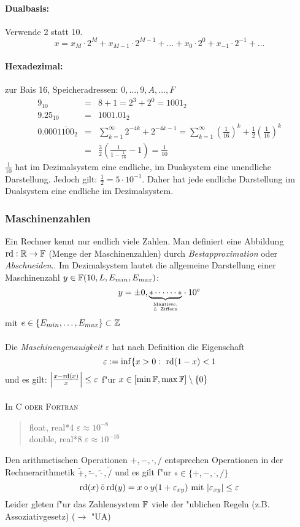 \documentclass{scrartcl}
\begin{document}
\paragraph*{Dualbasis:} Verwende 2 statt 10.
$$ x = x_M \cdot 2^M + x_{M-1}\cdot 2^{M-1} + \ldots + x_0 \cdot 2^0 + x_{-1} \cdot  2^{-1} + \ldots $$ 
\paragraph*{Hexadezimal:} zur Bais 16, Speicheradressen: $0, \ldots, 9, A, \ldots, F$
\begin{eqnarray*}
9_{10} & = & 8 + 1 = 2^3 + 2^0 = 1001_2 \\
9.25_{10} & = & 1001.01_2 \\
0.000\overline{1100}_2 & = & \sum\limits_{k=1}^{\infty} 2^{-4k} + 2^{-4k-1} = \sum\limits_{k=1}^{\infty} \left( \frac{1}{16} \right)^k + \frac{1}{2}  \left( \frac{1}{16} \right)^k \\
& = & \frac{3}{2} \left( \frac{1}{1-\frac{1}{16}} - 1 \right)= \frac{1}{10}
\end{eqnarray*} 
$\frac{1}{10}$ hat im Dezimalsystem eine endliche, im Dualsystem eine unendliche Darstellung. Jedoch gilt: $\frac{1}{2} = 5 \cdot 10^{-1}$. Daher hat jede endliche Darstellung im Dualsystem eine endliche im Dezimalsystem.

\subsubsection{Maschinenzahlen}
Ein Rechner kennt nur endlich viele Zahlen. Man definiert eine Abbildung $\mathrm{rd}: \mathbb{R} \rightarrow \mathbb{F}$ (Menge der Maschinenzahlen) durch \emph{Bestapproximation} oder \emph{Abschneiden}.. Im Dezimalsystem lautet die allgemeine Darstellung einer Maschinenzahl $y \in \mathbb{F}(10, L, E_{min}, E_{max})$:
$$ y = \pm 0, {\underbrace{* \cdots \cdots  *}_{ \genfrac{}{}{0pt}{}{\mathrm{Mantisse,}}{L  \ \mathrm{Ziffern}}   }}\cdot 10^e$$
mit $e \in \{ E_{min}, \ldots, E_{max} \} \subset \mathbb{Z}$ \\ \\
Die \emph{Maschinengenauigkeit} $\varepsilon$ hat nach Definition die Eigenschaft 
$$ \varepsilon := \inf \{ x>0: \ \mathrm{rd}(1-x) < 1 $$
und es gilt: $\left\vert \frac{x-\mathrm{rd}(x)}{x} \right\vert \leq \varepsilon$ f"ur $x \in [ \min \mathbb{F}, \max \mathbb{F} ] \setminus \{ 0 \}$ \\ \\
In \scshape{C} \normalfont oder \scshape{Fortran} \normalfont
\begin{quote}
float, real*4 \quad $\varepsilon \approx 10^{-8}$ \\
double, real*8 \quad $\varepsilon \approx 10^{-16}$
\end{quote}
Den arithmetischen Operationen $+, -, \cdot, /$ entsprechen Operationen in der Rechnerarithmetik $\tilde{+}, \tilde{-}, \tilde{\cdot}, \tilde{/}$ und es gilt f"ur $\circ \in \{ +, -, \cdot, / \}$ $$\mathrm{rd}(x) \, \tilde\circ \, \mathrm{rd}(y) = x \circ y (1 + \varepsilon_{xy}) \mathrm{\ mit \ } \vert \varepsilon_{xy} \vert \leq \varepsilon$$
Leider gleten f"ur das Zahlensystem $\mathbb{F}$ viele der "ublichen Regeln (z.B. Assoziativgesetz) ($\rightarrow$ "UA)
\end{document}
